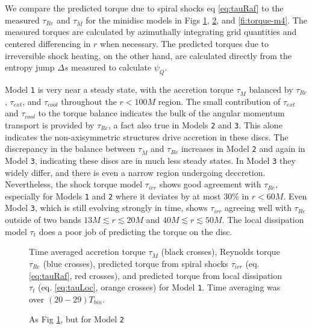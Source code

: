 \documentclass{emulateapj}
\newcommand{\De}{\Delta}
\newcommand{\model}[1]{{Model \texttt{#1}}}
\begin{document}
We compare the predicted torque due to spiral shocks eq \eqref{eq:tauRaf} to the measured $\tau_{Re}$ and $\tau_{\dot{M}}$ for the minidisc models in Figs \ref{fi:torque-m2}, \ref{fi:torque-m3}, and \ref{fi:torque-m4}.  The measured torques are calculated by azimuthally integrating grid quantities and centered differencing in $r$ when necessary.  The predicted torques due to irreversible shock heating, on the other hand, are calculated directly from the entropy jump $\De s$ measured to calculate $\psi_Q$.  

\model{1} is very near a steady state, with the accretion torque $\tau_{\dot{M}}$ balanced by $\tau_{Re}$, $\tau_{ext}$, and $\tau_{cool}$ throughout the $r < 100M$ region.  The small contribution of $\tau_{ext}$ and $\tau_{cool}$ to the torque balance indicates the bulk of the angular momentum transport is provided by $\tau_{Re}$, a fact also true in Models \texttt{2} and \texttt{3}.  This alone indicates the non-axisymmetric structures drive accretion in these discs.  The discrepancy in the balance between $\tau_{\dot{M}}$ and $\tau_{Re}$ increases in \model{2} and again in \model{3}, indicating these discs are in much less steady states.  In \model{3} they widely differ, and there is even a narrow region undergoing deccretion.  Nevertheless, the shock torque model $\tau_{irr}$ shows good agreement with $\tau_{Re}$, especially for Models \texttt{1} and \texttt{2} where it deviates by at most $30\%$ in $r < 60M$.  Even \model{3}, which is still evolving strongly in time, shows $\tau_{irr}$ agreeing well with $\tau_{Re}$ outside of two bands $13M \lesssim r \lesssim 20M$ and $40M \lesssim r \lesssim 50M$.  The local dissipation model $\tau_t$ does a poor job of predicting the torque on the disc.

\begin{figure}
	\caption{\label{fi:torque-m2} Time averaged accretion torque $\tau_{\dot{M}}$ (black crosses), Reynolds torque $\tau_{Re}$ (blue crosses), predicted torque from spiral shocks $\tau_{irr}$ (eq. \eqref{eq:tauRaf}, red crosses), and predicted torque from local dissipation $\tau_t$ (eq. \eqref{eq:tauLoc}, orange crosses) for \model{1}. Time averaging was over $(20-29)T_{bin}$.}  
\end{figure}

\begin{figure}
	\caption{\label{fi:torque-m3} As Fig \ref{fi:torque-m2}, but for \model{2}}  
\end{figure}
\end{document}
